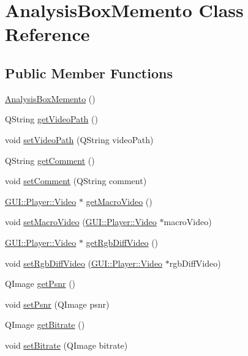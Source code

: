 \hypertarget{classMemento_1_1AnalysisBoxMemento}{}\section{Analysis\+Box\+Memento Class Reference}
\label{classMemento_1_1AnalysisBoxMemento}
\subsection*{Public Member Functions}
\begin{DoxyCompactItemize}
\item 
\hyperlink{classMemento_1_1AnalysisBoxMemento_a2891757dd897d8d7e04f6ac721863e30}{Analysis\+Box\+Memento} ()
\item 
Q\+String \hyperlink{classMemento_1_1AnalysisBoxMemento_a0aee21e65efbd5059679492dcb847281}{get\+Video\+Path} ()
\item 
void \hyperlink{classMemento_1_1AnalysisBoxMemento_a3db0ccff589bc23a3226a0ac59857437}{set\+Video\+Path} (Q\+String video\+Path)
\item 
Q\+String \hyperlink{classMemento_1_1AnalysisBoxMemento_a8475ee6c96bf1157aa07530f9100416c}{get\+Comment} ()
\item 
void \hyperlink{classMemento_1_1AnalysisBoxMemento_ab3a897eff60f58840c8d1b40292cf047}{set\+Comment} (Q\+String comment)
\item 
\hyperlink{classGUI_1_1Player_1_1Video}{G\+U\+I\+::\+Player\+::\+Video} $\ast$ \hyperlink{classMemento_1_1AnalysisBoxMemento_a4766ee11b86f10503824b3dc18ec3a6d}{get\+Macro\+Video} ()
\item 
void \hyperlink{classMemento_1_1AnalysisBoxMemento_ab43a2220425e3311fa978cebe61db3e4}{set\+Macro\+Video} (\hyperlink{classGUI_1_1Player_1_1Video}{G\+U\+I\+::\+Player\+::\+Video} $\ast$macro\+Video)
\item 
\hyperlink{classGUI_1_1Player_1_1Video}{G\+U\+I\+::\+Player\+::\+Video} $\ast$ \hyperlink{classMemento_1_1AnalysisBoxMemento_aeafaf51d6b8da8f5015d7887cf00c474}{get\+Rgb\+Diff\+Video} ()
\item 
void \hyperlink{classMemento_1_1AnalysisBoxMemento_a15413d63ffb3c5f97f39d3c2f11b5c0e}{set\+Rgb\+Diff\+Video} (\hyperlink{classGUI_1_1Player_1_1Video}{G\+U\+I\+::\+Player\+::\+Video} $\ast$rgb\+Diff\+Video)
\item 
Q\+Image \hyperlink{classMemento_1_1AnalysisBoxMemento_a581aa3ebb51a9ce69dcbe21d6f949e99}{get\+Psnr} ()
\item 
void \hyperlink{classMemento_1_1AnalysisBoxMemento_a5613ac52b106bb5859856712c3a3279f}{set\+Psnr} (Q\+Image psnr)
\item 
Q\+Image \hyperlink{classMemento_1_1AnalysisBoxMemento_a0b8e4c45925b9a6f85c327561d7a4369}{get\+Bitrate} ()
\item 
void \hyperlink{classMemento_1_1AnalysisBoxMemento_ad755ae317fc096de20872b5daf21d69d}{set\+Bitrate} (Q\+Image bitrate)
\end{DoxyCompactItemize}


